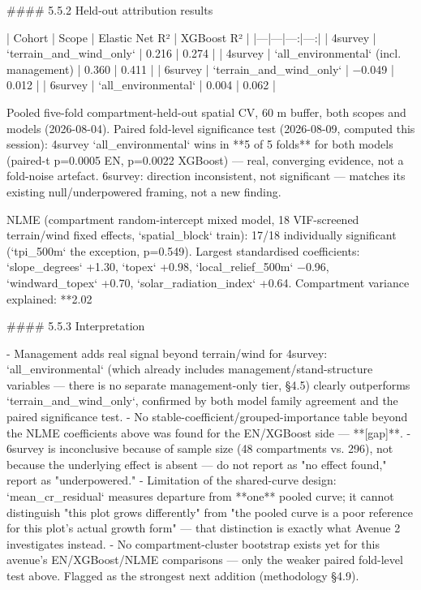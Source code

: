 #### 5.5.2 Held-out attribution results

| Cohort | Scope | Elastic Net R² | XGBoost R² |
|---|---|---:|---:|
| 4survey | `terrain_and_wind_only` | 0.216 | 0.274 |
| 4survey | `all_environmental` (incl. management) | 0.360 | 0.411 |
| 6survey | `terrain_and_wind_only` | −0.049 | 0.012 |
| 6survey | `all_environmental` | 0.004 | 0.062 |

Pooled five-fold compartment-held-out spatial CV, 60 m buffer, both scopes and models (2026-08-04).
Paired fold-level significance test (2026-08-09, computed this session): 4survey `all_environmental` wins in **5 of 5 folds** for both models (paired-t p=0.0005 EN, p=0.0022 XGBoost) — real, converging evidence, not a fold-noise artefact. 6survey: direction inconsistent, not significant — matches its existing null/underpowered framing, not a new finding.

NLME (compartment random-intercept mixed model, 18 VIF-screened terrain/wind fixed effects, `spatial_block` train): 17/18 individually significant (`tpi_500m` the exception, p=0.549). Largest standardised coefficients: `slope_degrees` +1.30, `topex` +0.98, `local_relief_500m` −0.96, `windward_topex` +0.70, `solar_radiation_index` +0.64. Compartment variance explained: **2.02%

#### 5.5.3 Interpretation

- Management adds real signal beyond terrain/wind for 4survey: `all_environmental` (which already includes management/stand-structure variables — there is no separate management-only tier, §4.5) clearly outperforms `terrain_and_wind_only`, confirmed by both model family agreement and the paired significance test.
- No stable-coefficient/grouped-importance table beyond the NLME coefficients above was found for the EN/XGBoost side — **[gap]**.
- 6survey is inconclusive because of sample size (48 compartments vs. 296), not because the underlying effect is absent — do not report as "no effect found," report as "underpowered."
- Limitation of the shared-curve design: `mean_cr_residual` measures departure from **one** pooled curve; it cannot distinguish "this plot grows differently" from "the pooled curve is a poor reference for this plot's actual growth form" — that distinction is exactly what Avenue 2 investigates instead.
- No compartment-cluster bootstrap exists yet for this avenue's EN/XGBoost/NLME comparisons — only the weaker paired fold-level test above. Flagged as the strongest next addition (methodology §4.9).

